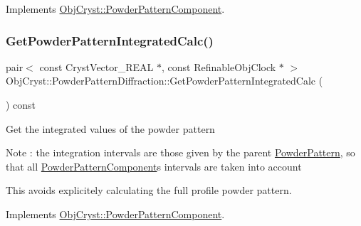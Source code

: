 Implements \mbox{\hyperlink{class_obj_cryst_1_1_powder_pattern_component_ad67b39669fd0d336b01937ee81a59ddc}{Obj\+Cryst\+::\+Powder\+Pattern\+Component}}.

\mbox{\label{class_obj_cryst_1_1_powder_pattern_diffraction_a2c6ee9bfa4ac1518bd0fcd70cbb5cb72}} 
\subsubsection{\texorpdfstring{GetPowderPatternIntegratedCalc()}{GetPowderPatternIntegratedCalc()}}
{\footnotesize\ttfamily pair$<$ const Cryst\+Vector\+\_\+\+R\+E\+AL $\ast$, const Refinable\+Obj\+Clock $\ast$ $>$ Obj\+Cryst\+::\+Powder\+Pattern\+Diffraction\+::\+Get\+Powder\+Pattern\+Integrated\+Calc (\begin{DoxyParamCaption}{ }\end{DoxyParamCaption}) const\hspace{0.3cm}{\ttfamily [virtual]}}

Get the integrated values of the powder pattern

\begin{DoxyNote}{Note}
\+: the integration intervals are those given by the parent \mbox{\hyperlink{class_obj_cryst_1_1_powder_pattern}{Powder\+Pattern}}, so that all \mbox{\hyperlink{class_obj_cryst_1_1_powder_pattern_component}{Powder\+Pattern\+Component}}\textquotesingle{}s intervals are taken into account
\end{DoxyNote}
This avoids explicitely calculating the full profile powder pattern. 

Implements \mbox{\hyperlink{class_obj_cryst_1_1_powder_pattern_component_ac54b7ae5a177492de681afc2cbed72eb}{Obj\+Cryst\+::\+Powder\+Pattern\+Component}}.

\mbox{\label{class_obj_cryst_1_1_powder_pattern_diffraction_a0af11c8ffb08972bcc13b71fd531071a}} 

